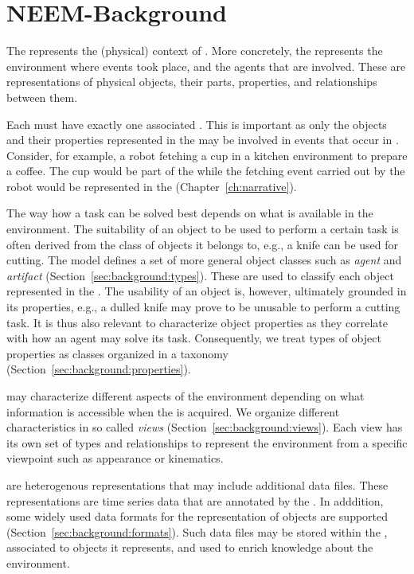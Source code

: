 
\chapter{NEEM-Background}
\label{ch:background}

The \neembak represents the (physical) context of \neems.
More concretely, the \neembak represents the environment where events took place, and the agents that are involved.
These are representations of physical objects, their parts, properties, and relationships between them.

Each \neem must have exactly one associated \neembak.
This is important as only the objects and their properties represented in the \neembak may be involved in events that occur in \neems.
Consider, for example, a robot fetching a cup in a kitchen environment to prepare a coffee.
The cup would be part of the \neembak while the fetching event carried out by the robot would be represented in the \neemnar (Chapter~\ref{ch:narrative}).

The way how a task can be solved best depends on what is available in the environment.
The suitability of an object to be used to perform a certain task is often derived from the class of objects it belongs to, e.g., a knife can be used for cutting.
The \neem model defines a set of more general object classes such as \emph{agent} and \emph{artifact} (Section~\ref{sec:background:types}).
These are used to classify each object represented in the \neembak.
%
The usability of an object is, however, ultimately grounded in its properties, e.g., a dulled knife may prove to be unusable to perform a cutting task.
It is thus also relevant to characterize object properties as they correlate with how an agent may solve its task.
Consequently, we treat types of object properties as classes organized in a taxonomy (Section~\ref{sec:background:properties}).

\neems may characterize different aspects of the environment depending on what information is accessible when the \neem is acquired.
We organize different characteristics in so called \emph{views} (Section~\ref{sec:background:views}).
Each view has its own set of types and relationships to represent the environment from a specific viewpoint such as appearance or kinematics.

\neems are heterogenous representations that may include additional data files.
These representations are time series data that are annotated by the \neemnar.
In adddition, some widely used data formats for the representation of objects are supported (Section~\ref{sec:background:formats}).
Such data files may be stored within the \neembak, associated to objects it represents, and used to enrich knowledge about the environment.

